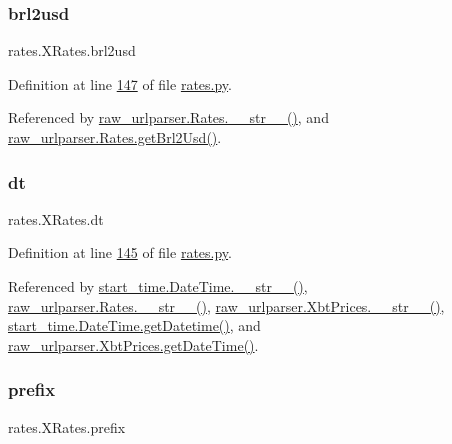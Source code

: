 \subsubsection{\texorpdfstring{brl2usd}{brl2usd}}
{\footnotesize\ttfamily rates.\+X\+Rates.\+brl2usd}



Definition at line \hyperlink{rates_8py_source_l00147}{147} of file \hyperlink{rates_8py_source}{rates.\+py}.



Referenced by \hyperlink{raw__urlparser_8py_source_l00038}{raw\+\_\+urlparser.\+Rates.\+\_\+\+\_\+str\+\_\+\+\_\+()}, and \hyperlink{raw__urlparser_8py_source_l00029}{raw\+\_\+urlparser.\+Rates.\+get\+Brl2\+Usd()}.

\mbox{\label{classrates_1_1_x_rates_aa7835a0ac1d41af607d6d5885b49c131}} 
\subsubsection{\texorpdfstring{dt}{dt}}
{\footnotesize\ttfamily rates.\+X\+Rates.\+dt}



Definition at line \hyperlink{rates_8py_source_l00145}{145} of file \hyperlink{rates_8py_source}{rates.\+py}.



Referenced by \hyperlink{start__time_2____init_____8py_source_l00034}{start\+\_\+time.\+Date\+Time.\+\_\+\+\_\+str\+\_\+\+\_\+()}, \hyperlink{raw__urlparser_8py_source_l00038}{raw\+\_\+urlparser.\+Rates.\+\_\+\+\_\+str\+\_\+\+\_\+()}, \hyperlink{raw__urlparser_8py_source_l00074}{raw\+\_\+urlparser.\+Xbt\+Prices.\+\_\+\+\_\+str\+\_\+\+\_\+()}, \hyperlink{start__time_2____init_____8py_source_l00031}{start\+\_\+time.\+Date\+Time.\+get\+Datetime()}, and \hyperlink{raw__urlparser_8py_source_l00059}{raw\+\_\+urlparser.\+Xbt\+Prices.\+get\+Date\+Time()}.

\mbox{\label{classrates_1_1_x_rates_a3b92b41b0fbd77b44d01f094ff83dd9d}} 
\subsubsection{\texorpdfstring{prefix}{prefix}}
{\footnotesize\ttfamily rates.\+X\+Rates.\+prefix}



